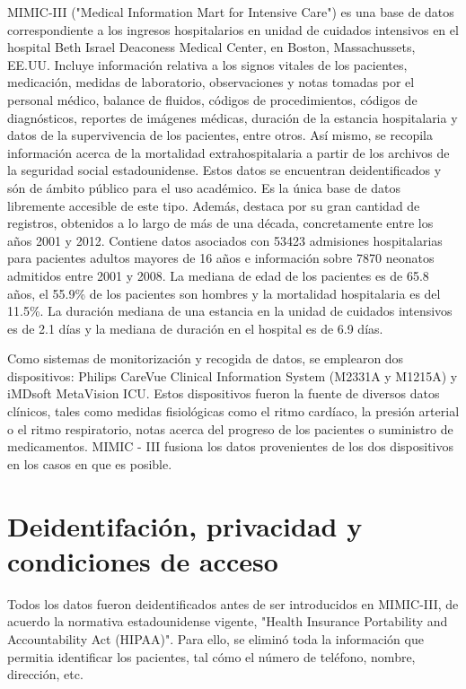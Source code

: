 \documentclass{report}
\begin{document}
MIMIC-III ("Medical Information Mart for Intensive Care") es una base de datos correspondiente a los ingresos hospitalarios en unidad de cuidados intensivos en el hospital Beth Israel Deaconess Medical Center, en Boston, Massachussets, EE.UU. Incluye información relativa a los signos vitales de los pacientes, medicación, medidas de laboratorio, observaciones y notas tomadas por el personal médico, balance de fluidos, códigos de procedimientos, códigos de diagnósticos, reportes de imágenes médicas, duración de la estancia hospitalaria y datos de la supervivencia de los pacientes, entre otros. Así mismo, se recopila información acerca de la mortalidad extrahospitalaria a partir de los archivos de la seguridad social estadounidense.  Estos datos se encuentran deidentificados y són de ámbito público para el uso académico. Es la única base de datos libremente accesible de este tipo. Además, destaca por su gran cantidad de registros, obtenidos a lo largo de más de una década, concretamente entre los años 2001 y 2012. Contiene datos asociados con 53423 admisiones hospitalarias para pacientes adultos mayores de 16 años e información sobre 7870 neonatos admitidos entre 2001 y 2008. La mediana de edad de los pacientes es de 65.8 años, el 55.9\% de los pacientes son hombres y la mortalidad hospitalaria es del 11.5\%. La duración mediana de una estancia en la unidad de cuidados intensivos es de 2.1 días y la mediana de duración en el hospital es de 6.9 días. 

Como sistemas de monitorización y recogida de datos, se emplearon dos dispositivos: Philips CareVue Clinical Information System (M2331A y M1215A) y iMDsoft MetaVision ICU. Estos dispositivos fueron la fuente de diversos datos clínicos, tales como medidas fisiológicas como el ritmo cardíaco, la presión arterial o el ritmo respiratorio, notas acerca del progreso de los pacientes o suministro de medicamentos. MIMIC - III fusiona los datos provenientes de los dos dispositivos en los casos en que es posible. 


\section{Deidentifación, privacidad y condiciones de acceso}

Todos los datos fueron deidentificados antes de ser introducidos en MIMIC-III, de acuerdo la normativa estadounidense vigente, "Health Insurance Portability and Accountability Act (HIPAA)". Para ello, se eliminó toda la información que permitia identificar los pacientes, tal cómo el número de teléfono, nombre, dirección, etc. 
\end{document}
